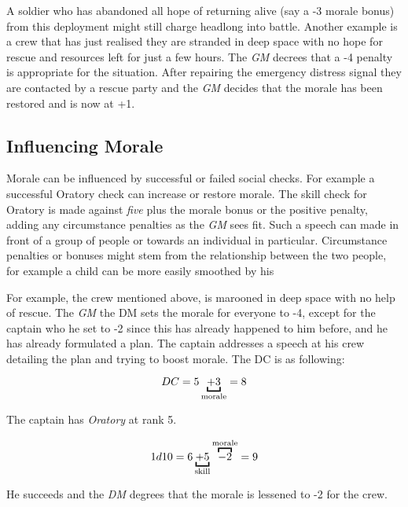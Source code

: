 A soldier who has abandoned all hope of returning alive (say a -3 morale
bonus) from this deployment might still charge headlong into battle. Another
example is a crew that has just realised they are stranded in deep space
with no hope for rescue and resources left for just a few hours. The
\emph{GM} decrees that a -4 penalty is appropriate for the situation. After
repairing the emergency distress signal they are contacted by a rescue party
and the \emph{GM} decides that the morale has been restored and is now at +1.

\subsection{Influencing Morale}
\label{sub:7-Influencing Morale}

Morale can be influenced by successful or failed social checks. For example
a successful Oratory check can increase or restore morale. The skill check for
Oratory is made against \emph{five} plus the morale bonus or the positive
penalty, adding any circumstance penalties as the \emph{GM} sees fit. Such a
speech can made in front of a group of people or towards an individual in
particular. Circumstance penalties or bonuses might stem from the relationship
between the two people, for example a child can be more easily smoothed by his

For example, the crew mentioned above, is marooned in deep space with no help
of rescue. The \emph{GM} the DM sets the morale for everyone to -4, except for
the captain who he set to -2 since this has already happened to him before,
and he has already formulated a plan. The captain addresses a speech at his
crew detailing the plan and trying to boost morale. The DC is as following:

\[
DC = 5 \ub{+ 3}{morale} = 8
\]

The captain has \emph{Oratory} at rank 5.

\[
1d10 = 6 \ub{+ 5}{skill} \ob{- 2}{morale} = 9
\]

He succeeds and the \emph{DM} degrees that the morale is lessened to -2 for
the crew.
